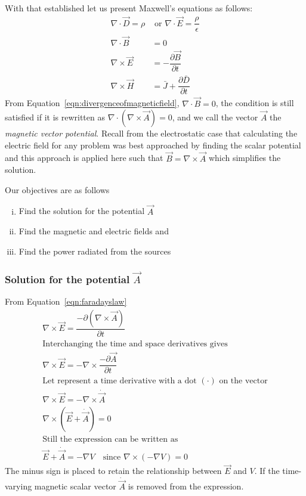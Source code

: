 With that established let us present Maxwell's equations as follows:
\begin{align}
\nabla\cdot\vec{D} =\rho&\text{ or }\nabla \cdot\vec{E} =\dfrac{\rho}{\epsilon}\label{eqn:gausslaw}\\
\nabla\cdot\vec{B}&=0\label{eqn:divergenceofmagneticfield}\\
\nabla\times\vec{E}&=- \dfrac{\partial\vec{B}}{\partial t}\label{eqn:faradayslaw}\\
\nabla\times\vec{H}&=\bar{J}+\dfrac{\partial\bar{D}}{\partial t}\label{eqn:ampereslaw}
\end{align}
From Equation~\eqref{eqn:divergenceofmagneticfield}, $\nabla\cdot\vec{B}=0$, the condition is still satisfied if it is rewritten as $\nabla\cdot(\nabla\times\vec{A})=0$, and we call the vector $\vec{A}$ the \emph{magnetic vector potential}. Recall from the electrostatic case that calculating the electric field for any problem was best approached by finding the scalar potential and this approach is applied here such that $\vec{B}=\nabla\times\vec{A}$ which simplifies the solution.

Our objectives are as follows
\begin{enumerate}[(i)]
\item Find the solution for the potential $\vec{A}$
\item Find the magnetic and electric fields and
\item Find the power radiated from the sources
\end{enumerate}

\subsubsection*{Solution for the potential $\vec{A}$}
From Equation~\eqref{eqn:faradayslaw}
\begin{align*}
&\nabla\times\vec{E}=\dfrac{-\partial(\nabla\times\vec{A})}{\partial t}&\\
&\text{Interchanging the time and space derivatives gives}&\\
&\nabla\times\vec{E}=-\nabla\times\dfrac{-\partial\vec{A}}{\partial t}&\\
&\text{Let represent a time derivative with a dot }(\cdot)\text{ on the vector}&\\
&\nabla\times\vec{E}=-\nabla\times\dot{\vec{A}}&\\
&\nabla\times(\vec{E}+\dot{\vec{A}})=0&\\
&\text{Still the expression can be written as}&\\
&\vec{E}+\dot{\vec{A}}= -\nabla V\quad\text{since }\nabla\times(-\nabla V)=0&
\end{align*}
The minus sign is placed to retain the relationship between $\vec{E}$ and $V$. If the time-varying magnetic scalar vector $\dot{\vec{A}}$ is removed from the expression.

